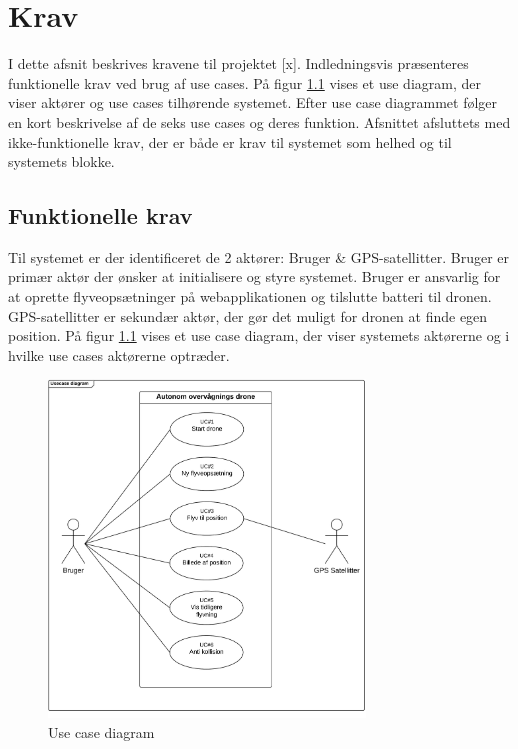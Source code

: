 \chapter{Krav}
\vspace{-0.5cm}
I dette afsnit beskrives kravene til projektet [x]. Indledningsvis præsenteres funktionelle krav  ved brug af use cases. På figur \ref{fig:useCaseDiagram} vises et use diagram, der viser aktører og use cases tilhørende systemet. Efter use case diagrammet følger en kort beskrivelse af de seks use cases og deres funktion. Afsnittet afsluttets med ikke-funktionelle krav, der er både er krav til systemet som helhed og til systemets blokke.
\vspace{-0.3cm}

\section{Funktionelle krav}
\vspace{-0.2cm}
Til systemet er der identificeret de 2 aktører: Bruger \& GPS-satellitter. Bruger er primær aktør der ønsker at initialisere og styre systemet. Bruger er ansvarlig for at oprette flyveopsætninger på webapplikationen og tilslutte batteri til dronen.
GPS-satellitter er sekundær aktør, der gør det muligt for dronen at finde egen position. 
På figur \ref{fig:useCaseDiagram} vises et use case diagram, der viser systemets aktørerne og i hvilke use cases aktørerne optræder. 
\begin{figure}[H]
	\centering
	\includegraphics[width=0.75\textwidth]{Billeder/Krav/Use_case_diagram}
	\vspace{-0.3cm}	
	\caption{Use case diagram}
	\label{fig:useCaseDiagram}
\end{figure}

